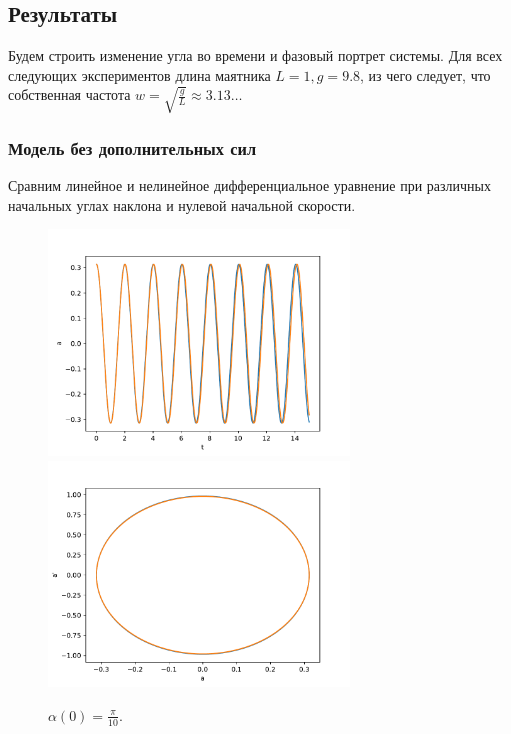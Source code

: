         

    \subsection{Результаты}
        Будем строить изменение угла во времени и фазовый портрет системы. Для всех следующих экспериментов длина маятника $L = 1, g = 9.8$, из чего следует, что собственная частота $w = \sqrt{\frac{g}{L}} \approx 3.13\dots$
        \subsubsection{Модель без дополнительных сил}
            Сравним линейное и нелинейное дифференциальное уравнение при различных начальных углах наклона и нулевой начальной скорости.

            \begin{figure}[H]
                \centering
                \includegraphics[width=8cm]{pictures/12resonance10.pdf}
                \includegraphics[width=8cm]{pictures/12resonance10p.pdf}
                \caption{$\alpha(0) = \frac{\pi}{10}$.}
            \end{figure}

